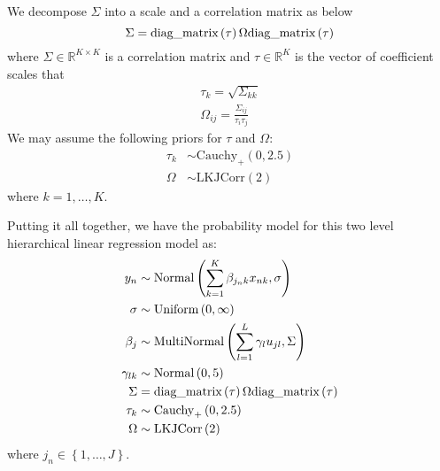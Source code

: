 \documentclass[12pt]{article}
\def\eqsuma{\sum \limits_{k=1}^K \beta_{j_nk} x_{nk}}
\def\eqsumb{\sum \limits_{l=1}^L \gamma_l u_{jl}}
\begin{document}
We decompose $\Sigma$ into a scale and a correlation matrix as below
\begin{equation}
  \Sigma = \text{diag\textunderscore matrix}\left(\tau\right)\Omega \text{diag\textunderscore matrix}\left(\tau\right)
\end{equation}
where $\Sigma \in \mathbb{R}^{K \times K}$ is a correlation matrix and $\tau \in \mathbb{R}^K$ is the vector of coefficient scales that
\begin{gather*}
  \tau_k = \sqrt{\Sigma_{kk}} \\
  \Omega_{ij} = \frac{\Sigma_{ij}}{\tau_i \tau_j}
\end{gather*}
We may assume the following priors for $\tau$ and $\Omega$:
\begin{align*}
  \tau_k &\sim \mathrm{Cauchy}_+\left(0, 2.5\right) \\
  \Omega &\sim \mathrm{LKJCorr}\left(2 \right)
\end{align*}
where $k=1,\ldots, K$.

Putting it all together, we have the probability model for this two level hierarchical linear regression model as:
\begin{align*}
  y_n &\sim \mathrm{Normal}\left(\eqsuma,\sigma \right) \\
  \sigma &\sim \mathrm{Uniform} \left(0, \infty \right) \\
  \beta_j &\sim \mathrm{MultiNormal}\left(\eqsumb, \Sigma \right) \\
  \gamma_{lk} &\sim \mathrm{Normal} \left(0, 5 \right) \\
  \Sigma &= \text{diag\textunderscore matrix}\left(\tau\right)\Omega \text{diag\textunderscore matrix}\left(\tau\right)\\
  \tau_k &\sim \mathrm{Cauchy}_+\left(0, 2.5\right) \\
  \Omega &\sim \mathrm{LKJCorr}\left(2 \right)
\end{align*}
where $j_n \in \left\{1,\ldots,J \right\}$.
\end{document}
